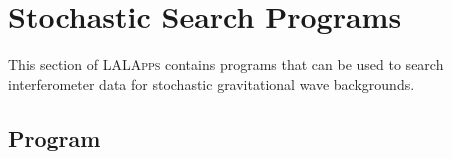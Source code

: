 
\chapter{Stochastic Search Programs}
\label{chapter:stochastic}

This section of \textsc{LALApps} contains programs that can be used to
search interferometer data for stochastic gravitational wave
backgrounds.

\clearpage


\clearpage
\section{Program }
\label{program:stochastic-pipeline}

